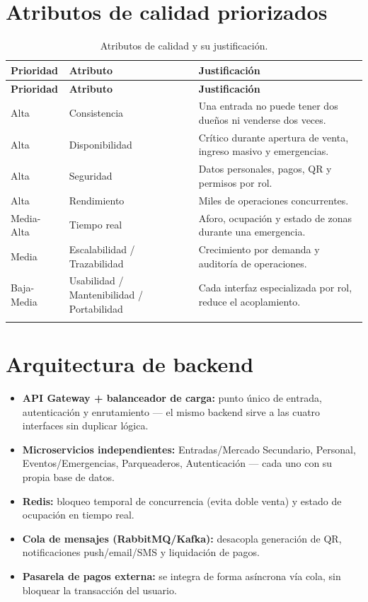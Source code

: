 \section{Atributos de calidad priorizados}

\begin{longtable}{p{2.2cm}p{3cm}p{8.5cm}}
\toprule
\textbf{Prioridad} & \textbf{Atributo} & \textbf{Justificación}\\
\midrule
\endfirsthead
\toprule
\textbf{Prioridad} & \textbf{Atributo} & \textbf{Justificación}\\
\midrule
\endhead
Alta & Consistencia & Una entrada no puede tener dos dueños ni venderse dos veces.\\
Alta & Disponibilidad & Crítico durante apertura de venta, ingreso masivo y emergencias.\\
Alta & Seguridad & Datos personales, pagos, QR y permisos por rol.\\
Alta & Rendimiento & Miles de operaciones concurrentes.\\
Media-Alta & Tiempo real & Aforo, ocupación y estado de zonas durante una emergencia.\\
Media & Escalabilidad / Trazabilidad & Crecimiento por demanda y auditoría de operaciones.\\
Baja-Media & Usabilidad / Mantenibilidad / Portabilidad & Cada interfaz especializada por rol,
reduce el acoplamiento.\\
\bottomrule
\caption{Atributos de calidad y su justificación.}
\end{longtable}

\section{Arquitectura de backend}

\begin{itemize}
\item \textbf{API Gateway + balanceador de carga:} punto único de entrada, autenticación y
enrutamiento --- el mismo backend sirve a las cuatro interfaces sin duplicar lógica.
\item \textbf{Microservicios independientes:} Entradas/Mercado Secundario, Personal,
Eventos/Emergencias, Parqueaderos, Autenticación --- cada uno con su propia base de datos.
\item \textbf{Redis:} bloqueo temporal de concurrencia (evita doble venta) y estado de ocupación
en tiempo real.
\item \textbf{Cola de mensajes (RabbitMQ/Kafka):} desacopla generación de QR, notificaciones
push/email/SMS y liquidación de pagos.
\item \textbf{Pasarela de pagos externa:} se integra de forma asíncrona vía cola, sin bloquear la
transacción del usuario.
\end{itemize}

